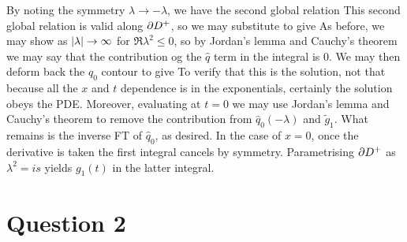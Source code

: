\documentclass{article}
\begin{document}
By noting the symmetry $\lambda \to - \lambda$, we have the second global relation 
This second global relation is valid along $\partial D^+$, so we may substitute to give 
As before, we may show 
as $\left\lvert \lambda \right\rvert \to \infty$ for $\Re\lambda^2 \leq 0$, so by Jordan's lemma and Cauchy's theorem we may say that the contribution og the $\hat{q}$ term in the integral is 0. We may then deform back the $\hat{q}_0$ contour to give 
To verify that this is the solution, not that because all the $x$ and $t$ dependence is in the exponentials, certainly the solution obeys the PDE. Moreover, evaluating at $t=0$ we may use Jordan's lemma and Cauchy's theorem to remove the contribution from $\hat{q}_0(-\lambda)$ and $\tilde{g}_1$. What remains is the inverse FT of $\hat{q}_0$, as desired. In the case of $x=0$, once the derivative is taken the first integral cancels by symmetry. Parametrising $\partial D^+$ as $\lambda^2 = is$ yields $g_1(t)$ in the latter integral. 

\section{Question 2}

\end{document}
